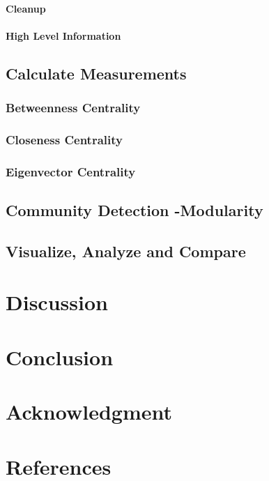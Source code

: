 \documentclass[11pt,twocolumn]{article}
\begin{document}
\paragraph{Cleanup}


\paragraph{High Level Information} 


\subsection{Calculate Measurements }

\subsubsection{Betweenness Centrality} 

\subsubsection{Closeness Centrality}

\subsubsection{Eigenvector Centrality} 
 
\subsection{Community Detection -Modularity}

\subsection{Visualize, Analyze and Compare}


\section{Discussion}


\section{Conclusion}


\section{Acknowledgment}
\section{References}
 

\end{document}
